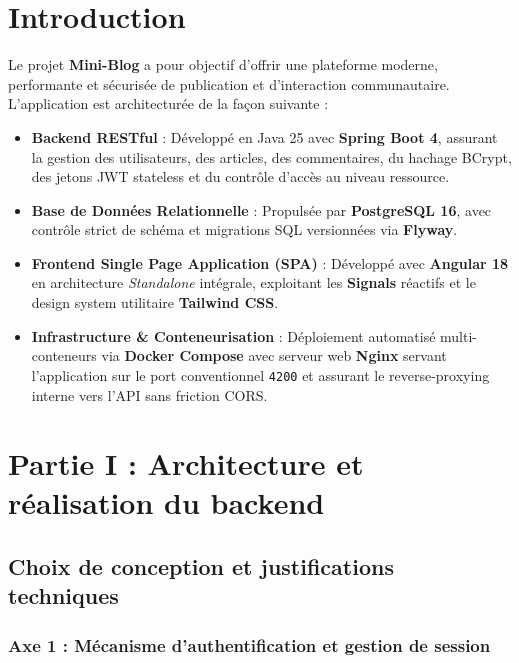 \documentclass[11pt,a4paper]{article}
\begin{document}
\section{Introduction}

Le projet \textbf{Mini-Blog} a pour objectif d'offrir une plateforme moderne, performante et sécurisée de publication et d'interaction communautaire. L'application est architecturée de la façon suivante :
\begin{itemize}
    \item \textbf{Backend RESTful} : Développé en Java 25 avec \textbf{Spring Boot 4}, assurant la gestion des utilisateurs, des articles, des commentaires, du hachage BCrypt, des jetons JWT stateless et du contrôle d'accès au niveau ressource.
    \item \textbf{Base de Données Relationnelle} : Propulsée par \textbf{PostgreSQL 16}, avec contrôle strict de schéma et migrations SQL versionnées via \textbf{Flyway}.
    \item \textbf{Frontend Single Page Application (SPA)} : Développé avec \textbf{Angular 18} en architecture \textit{Standalone} intégrale, exploitant les \textbf{Signals} réactifs et le design system utilitaire \textbf{Tailwind CSS}.
    \item \textbf{Infrastructure \& Conteneurisation} : Déploiement automatisé multi-conteneurs via \textbf{Docker Compose} avec serveur web \textbf{Nginx} servant l'application sur le port conventionnel \texttt{4200} et assurant le reverse-proxying interne vers l'API sans friction CORS.
\end{itemize}

\newpage

\section{Partie I : Architecture et réalisation du backend}

\subsection{Choix de conception et justifications techniques}

\subsubsection{Axe 1 : Mécanisme d'authentification et gestion de session}
\end{document}
